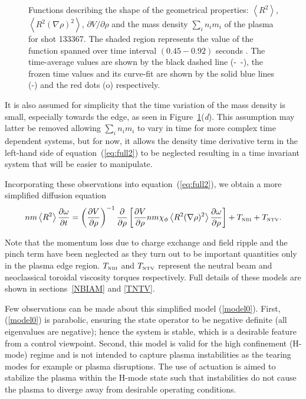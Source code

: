 \documentclass[12pt]{iopart}
\begin{document}
\begin{figure}
\begin{tabular}{cc}
\end{tabular}
\caption{Functions describing the shape of the geometrical properties: $\left< R^2 \right>$, $\left< R^2 (\nabla\rho)^2 \right>$, $\partial V/\partial \rho$ and  the mass density $ \sum_i n_i m_i $ of the plasma for shot 133367.  The shaded region represents the value of the function spanned over time interval $(0.45-0.92)$ seconds . The time-average values are shown by the black dashed line (-~-), the frozen time values and its curve-fit are shown by the solid blue lines (-) and the red dots (o) respectively.}
\label{fig:geofunc}
\end{figure}

It is also assumed for simplicity that the time variation of the mass density is small, especially towards the edge, as seen in Figure~{\ref{fig:geofunc}}(\emph{d}). 
 This assumption may latter be removed allowing $ \sum_i n_i m_i $  to vary in time for more complex time dependent systems, but for now, it allows the density time derivative term in the left-hand side of equation~(\ref{eq:full2}) to be neglected resulting in a time invariant system that will be easier to manipulate.
 
 Incorporating these observations into equation~(\ref{eq:full2}), we obtain a more simplified diffusion equation
\begin{eqnarray}
  n m \left<R^2\right>
 \frac{\partial \omega}{\partial t} \nonumber 
 = \left( \frac{\partial V}{\partial\rho}\right)^{-1}
   \frac{\partial}{\partial \rho} 
   \left[\frac{\partial V}{\partial \rho} n m \chi_\phi 
   \left< R^2 (\nabla \rho)^2\right> 
   \frac{\partial\omega}{\partial\rho}\right] %
   + T_\textrm{\tiny NBI} + T_\textrm{\tiny NTV} .
\label{model0}
\end{eqnarray}

Note that the momentum loss due to charge exchange and field ripple and the pinch term have been neglected as they turn out to be important quantities only in the plasma edge region. $T_\textrm{\tiny NBI} $ and $T_\textrm{\tiny NTV}$ represent the neutral beam and neoclassical toroidal viscosity torques respectively. Full details of these models are shown in sections~\ref{NBIAM} and \ref{TNTV}.
  
Few observations can be made about this simplified model (\ref{model0}). First,  (\ref{model0}) is parabolic, ensuring the state operator to be negative definite (all eigenvalues are negative);  hence the system is stable, which is a desirable feature from a control viewpoint. 
Second, this model is valid for the high confinement (H-mode) regime and is not intended to capture plasma instabilities as the tearing modes for example or plasma disruptions. The use of actuation is aimed to stabilize the plasma within the H-mode state such that instabilities do not cause the plasma to diverge away from desirable operating conditions.
  
\end{document}
